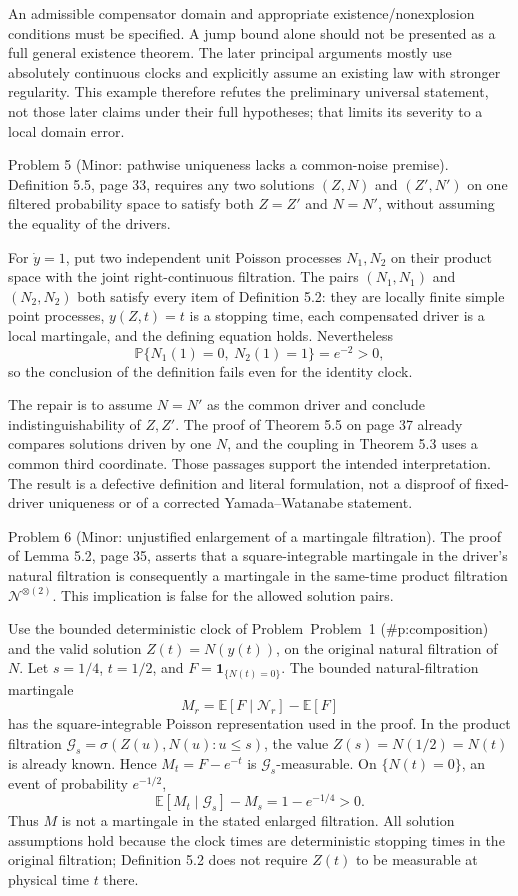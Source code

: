 \documentclass[10pt]{article}
\begin{document}
An admissible compensator domain and appropriate existence/nonexplosion conditions must be specified. A jump bound alone should not be presented as a full general existence theorem. The later principal arguments mostly use absolutely continuous clocks and explicitly assume an existing law with stronger regularity. This example therefore refutes the preliminary universal statement, not those later claims under their full hypotheses; that limits its severity to a local domain error.\par
Problem 5 (Minor: pathwise uniqueness lacks a common-noise premise).  Definition 5.5, page 33, requires any two solutions \((Z,N)\) and \((Z',N')\) on one filtered probability space to satisfy both \(Z=Z'\) and \(N=N'\), without assuming the equality of the drivers.\par
For \(\dot y=1\), put two independent unit Poisson processes \(N_1,N_2\) on their product space with the joint right-continuous filtration. The pairs \((N_1,N_1)\) and \((N_2,N_2)\) both satisfy every item of Definition 5.2: they are locally finite simple point processes, \(y(Z,t)=t\) is a stopping time, each compensated driver is a local martingale, and the defining equation holds. Nevertheless \[\mathbb P\{N_1(1)=0,\ N_2(1)=1\}=e^{-2}>0,\] so the conclusion of the definition fails even for the identity clock.\par
The repair is to assume \(N=N'\) as the common driver and conclude indistinguishability of \(Z,Z'\). The proof of Theorem 5.5 on page 37 already compares solutions driven by one \(N\), and the coupling in Theorem 5.3 uses a common third coordinate. Those passages support the intended interpretation. The result is a defective definition and literal formulation, not a disproof of fixed-driver uniqueness or of a corrected Yamada–Watanabe statement.\par
Problem 6 (Minor: unjustified enlargement of a martingale filtration).  The proof of Lemma 5.2, page 35, asserts that a square-integrable martingale in the driver’s natural filtration is consequently a martingale in the same-time product filtration \(\mathcal N^{\otimes(2)}\). This implication is false for the allowed solution pairs.\par
Use the bounded deterministic clock of Problem Problem 1 (\#p:composition) and the valid solution \(Z(t)=N(y(t))\), on the original natural filtration of \(N\). Let \(s=1/4\), \(t=1/2\), and \(F=\mathbf1_{\{N(t)=0\}}\). The bounded natural-filtration martingale \[M_r=\mathbb E[F\mid\mathcal N_r]-\mathbb E[F]\] has the square-integrable Poisson representation used in the proof. In the product filtration \(\mathcal G_s=\sigma(Z(u),N(u):u\leq s)\), the value \(Z(s)=N(1/2)=N(t)\) is already known. Hence \(M_t=F-e^{-t}\) is \(\mathcal G_s\)-measurable. On \(\{N(t)=0\}\), an event of probability \(e^{-1/2}\), \[\mathbb E[M_t\mid\mathcal G_s]-M_s=1-e^{-1/4}>0.\] Thus \(M\) is not a martingale in the stated enlarged filtration. All solution assumptions hold because the clock times are deterministic stopping times in the original filtration; Definition 5.2 does not require \(Z(t)\) to be measurable at physical time \(t\) there.\par
\end{document}
